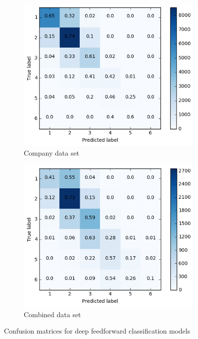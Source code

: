 \begin{figure}[h]
\begin{subfigure}{.4\textwidth}
  \includegraphics[width=.95\linewidth]{img/corp_d1_cm_favorites}
  \caption{Company data set}
  \label{fig:d1_fav_distr_sub3}
\end{subfigure}%
\begin{subfigure}{.4\textwidth}
  \includegraphics[width=.95\linewidth]{img/comb_d1_cm_favorites}
  \caption{Combined data set}
  \label{fig:d1_fav_distr_sub4}
\end{subfigure}%
\caption{Confusion matrices for deep feedforward classification models}
\label{fig:d1_fav_cm}
\end{figure}

